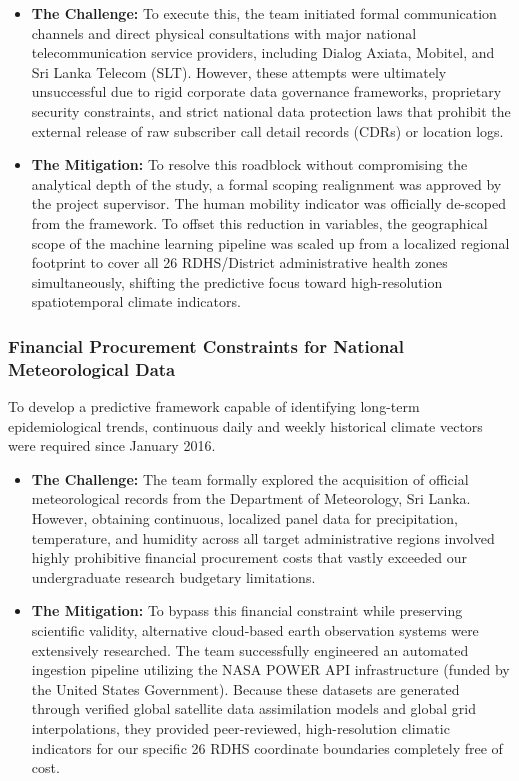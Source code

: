\documentclass[12pt,a4paper]{article}
\begin{document}
\begin{itemize}
    \item \textbf{The Challenge:} To execute this, the team initiated formal communication channels and direct physical consultations with major national telecommunication service providers, including Dialog Axiata, Mobitel, and Sri Lanka Telecom (SLT). However, these attempts were ultimately unsuccessful due to rigid corporate data governance frameworks, proprietary security constraints, and strict national data protection laws that prohibit the external release of raw subscriber call detail records (CDRs) or location logs.
    \item \textbf{The Mitigation:} To resolve this roadblock without compromising the analytical depth of the study, a formal scoping realignment was approved by the project supervisor. The human mobility indicator was officially de-scoped from the framework. To offset this reduction in variables, the geographical scope of the machine learning pipeline was scaled up from a localized regional footprint to cover all 26 RDHS/District administrative health zones simultaneously, shifting the predictive focus toward high-resolution spatiotemporal climate indicators.
\end{itemize}

\subsubsection{Financial Procurement Constraints for National Meteorological Data}
To develop a predictive framework capable of identifying long-term epidemiological trends, continuous daily and weekly historical climate vectors were required since January 2016.

\begin{itemize}
    \item \textbf{The Challenge:} The team formally explored the acquisition of official meteorological records from the Department of Meteorology, Sri Lanka. However, obtaining continuous, localized panel data for precipitation, temperature, and humidity across all target administrative regions involved highly prohibitive financial procurement costs that vastly exceeded our undergraduate research budgetary limitations.
    \item \textbf{The Mitigation:} To bypass this financial constraint while preserving scientific validity, alternative cloud-based earth observation systems were extensively researched. The team successfully engineered an automated ingestion pipeline utilizing the NASA POWER API infrastructure (funded by the United States Government). Because these datasets are generated through verified global satellite data assimilation models and global grid interpolations, they provided peer-reviewed, high-resolution climatic indicators for our specific 26 RDHS coordinate boundaries completely free of cost.
\end{itemize}
\end{document}
